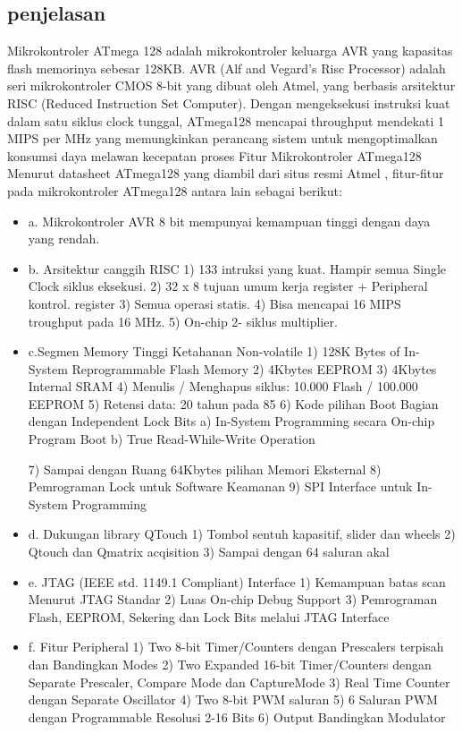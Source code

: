 	\subsection{penjelasan}
	Mikrokontroler ATmega 128 adalah mikrokontroler keluarga AVR yang kapasitas flash memorinya sebesar 128KB. AVR (Alf and Vegard’s Risc Processor) adalah seri mikrokontroler CMOS 8-bit yang dibuat oleh Atmel, yang berbasis arsitektur RISC (Reduced Instruction Set Computer). Dengan mengeksekusi instruksi kuat dalam satu siklus clock tunggal, ATmega128 mencapai throughput mendekati 1 MIPS per MHz yang memungkinkan perancang sistem untuk mengoptimalkan konsumsi daya melawan kecepatan proses
	Fitur Mikrokontroler ATmega128
	Menurut datasheet ATmega128 yang diambil dari situs resmi Atmel , fitur-fitur pada mikrokontroler ATmega128 antara lain sebagai berikut:
	\begin{itemize}
		\item a. Mikrokontroler AVR 8 bit mempunyai kemampuan tinggi dengan daya yang rendah. 
		\item b. Arsitektur canggih RISC
				1) 133 intruksi yang kuat. Hampir semua Single Clock siklus eksekusi.
				2) 32 x 8 tujuan umum kerja register + Peripheral kontrol. register 
				3) Semua operasi statis.
				4) Bisa mencapai 16 MIPS troughput pada 16 MHz.
				5) On-chip 2- siklus multiplier.
		\item c.Segmen Memory Tinggi Ketahanan Non-volatile 
				1) 128K Bytes of In-System Reprogrammable Flash Memory
				2) 4Kbytes EEPROM
				3) 4Kbytes Internal SRAM
				4) Menulis / Menghapus siklus: 10.000 Flash / 100.000 EEPROM 
				5) Retensi data: 20 tahun pada 85 
				6) Kode pilihan Boot Bagian dengan Independent Lock Bits 
					a) In-System Programming secara On-chip Program Boot 
					b) True Read-While-Write Operation 
					
				7) Sampai dengan Ruang 64Kbytes pilihan Memori Eksternal
				8) Pemrograman Lock untuk Software Keamanan
				9) SPI Interface untuk In-System Programming
		\item d. Dukungan library QTouch
				1) Tombol sentuh kapasitif, slider dan wheels 
				2) Qtouch dan Qmatrix acqisition 
				3) Sampai dengan 64 saluran akal 
		\item e. JTAG (IEEE std. 1149.1 Compliant) Interface
				1) Kemampuan batas scan Menurut JTAG Standar
				2) Luas On-chip Debug Support 3) Pemrograman Flash, EEPROM, Sekering dan Lock Bits melalui  JTAG Interface
		\item f. Fitur Peripheral 
				1) Two 8-bit Timer/Counters dengan Prescalers terpisah dan Bandingkan Modes 
				2) Two Expanded 16-bit Timer/Counters dengan Separate Prescaler, Compare Mode dan CaptureMode 
				3) Real Time Counter dengan Separate Oscillator
				4) Two 8-bit PWM saluran 
				5) 6 Saluran PWM dengan Programmable Resolusi 2-16 Bits 
				6) Output Bandingkan Modulator

		\end{itemize}
		
	\cite{kioumars2011atmega}
	\cite{stankovic2008wireless}

	